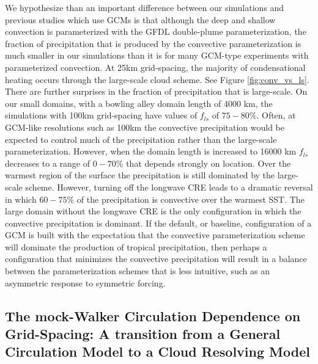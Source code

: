 \documentclass[11pt]{article}   	%
\begin{document}
We hypothesize than an important difference between our simulations and previous studies which use GCMs
is that although the deep and shallow convection is parameterized
with the GFDL double-plume parameterization, the fraction of precipitation that is produced by the convective parameterization 
is much smaller in our simulations than it is for many GCM-type experiments with parameterized convection.   At 25km grid-spacing, 
the majority of condensational heating occurs through the large-scale cloud  scheme.   See Figure \ref{fig:conv_vs_ls}.
There are further surprises in the fraction of precipitation that is large-scale.  On our small 
domains, with a bowling alley domain length of 4000 km, the simulations with 100km grid-spacing have values of $f_{ls}$ 
of $75-80\%$.  Often, at GCM-like resolutions such as 100km the convective precipitation would be expected to control much of the
precipitation rather than the large-scale parameterization.  However, when the domain length is increased to 16000 km
$f_{ls}$ decreases to a range of $0-70\%$ that depends strongly on location.  Over the warmest region of the surface the 
precipitation is still dominated by the large-scale scheme.  However, turning off the longwave CRE leads to a dramatic reversal 
in which $60-75\%$ of the precipitation is convective over the warmest SST.  The large domain without the longwave CRE is the 
only configuration in which the convective precipitation is dominant.    If the default, or baseline, configuration of a GCM is built 
with the expectation that the convective parameterization scheme will dominate the production of tropical precipitation, then 
perhaps a configuration that minimizes the convective precipitation will result in a balance between the parameterization 
schemes that is less intuitive, such as an asymmetric response to symmetric forcing.  

\subsection{The mock-Walker Circulation Dependence on Grid-Spacing: A transition from a 
General Circulation Model to a Cloud Resolving Model}
\end{document}
